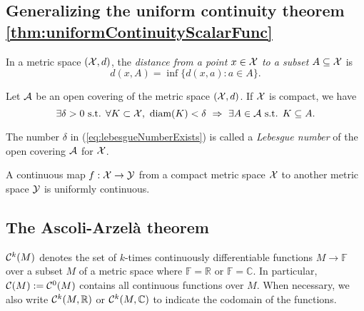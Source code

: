 \subsection{Generalizing
  the uniform continuity theorem
  \ref{thm:uniformContinuityScalarFunc}}

\begin{defn}
  \label{def:distancePoint2Set}
  In a metric space $({\cal X},d)$,
  the \emph{distance from a point $x\in{\cal X}$
    to a subset $A\subseteq {\cal X}$} is
  \begin{equation}
    \label{eq:distancePoint2Set}
    d(x,A) = \inf\{d(x,a): a\in A\}.
  \end{equation}
\end{defn}

\begin{lem}
  \label{lem:lebesgueNumberExists}
  Let ${\cal A}$ be an open covering
  of the metric space $({\cal X},d)$. 
  If ${\cal X}$ is compact, we have
  \begin{equation}
    \label{eq:lebesgueNumberExists}
    \exists \delta>0 \text{ s.t. }
    \forall K\subset {\cal X},\
    \text{diam}(K)<\delta\ \Rightarrow\
    \exists A\in{\cal A} \text{ s.t. } K\subseteq A.
  \end{equation}
\end{lem}

\begin{defn}
  \label{def:lebesgueNumber}
  The number $\delta$ in (\ref{eq:lebesgueNumberExists})
  is called a \emph{Lebesgue number}
  of the open covering ${\cal A}$ for ${\cal X}$.
\end{defn}

\begin{thm}
  \label{thm:generalizedUniformContinuity}
  A continuous map $f:{\cal X}\rightarrow {\cal Y}$
  from a compact metric space ${\cal X}$
  to another metric space ${\cal Y}$
  is uniformly continuous.
\end{thm}


\subsection{The Ascoli-Arzel\`{a} theorem}
\label{sec:ascoli-arzela-theor}

\begin{ntn}
  \label{ntn:setOfContinuousScalarFuncs}
  ${\cal C}^{k}(M)$
  denotes the set of $k$-times continuously differentiable functions
  $M\rightarrow \mathbb{F}$
  over a subset $M$ of a metric space where $\mathbb{F}=\mathbb{R}$
  or $\mathbb{F}=\mathbb{C}$.
  In particular, 
  ${\cal C}(M):={\cal C}^{0}(M)$
  contains all continuous functions over $M$.
  When necessary, we also write ${\cal C}^k(M,\mathbb{R})$
  or ${\cal C}^k(M,\mathbb{C})$
  to indicate the codomain of the functions. 
\end{ntn}

